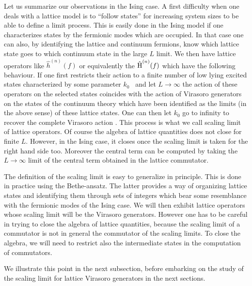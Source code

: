 

Let us summarize our observations  in the Ising case. A first difficulty when
one deals with a lattice model is to ``follow states'' for increasing system
sizes to be able to define a limit process. This is easily done in the
 Ising model if one
characterizes  states by the fermionic  modes which are occupied. In that
case one can also, by identifying the lattice and continuum fermions,
know  which lattice state goes to which continuum state in the  large $L$
limit.
 We then have lattice operators  like $\hat{h}^{(n)}(f)$
or equivalently the $\hat{\hbox{H}}^{(n)}(f)$ which have the following
behaviour.
If one first restricts their  action
to a finite number of low lying  excited states characterized
by some parameter $k_0$ \scal\  and   let
$L\rightarrow\infty$ the
action of these operators on the selected states coincides with the
action of Virasoro generators on the states of the continuum theory which have
been identified as the limits (in the above sense) of these lattice states.
One can then let $k_0$ go to infinity to recover the complete Virasoro
action \viri. This process is what we call scaling limit of  lattice operators.
Of course the algebra of lattice quantities does not
 close for finite $L$. However, in the Ising case,  it closes once
the scaling limit is taken for  the right hand side too.
 Moreover the
central term can be computed by taking the $L\rightarrow\infty$ limit
of the central term obtained in the lattice commutator.

The definition of the scaling
limit is easy to generalize in principle. This is done
 in practice using the Bethe-ansatz. The latter provides a way of organizing
lattice states and identifying
 them through sets of integers which bear some resemblance with the
fermionic modes of the Ising case.  We will then exhibit lattice operators
whose   scaling limit will be the Virasoro generators. However one has
 to be
careful in trying to close the algebra of lattice quantities,
  because the scaling limit of a  commutator
is  not in general the commutator of the scaling limits. To close the
 algebra, we will
need to restrict also the intermediate states
 in the computation of commutators.

 We illustrate  this point in the next subsection,
 before embarking on the study of
the scaling limit for lattice Virasoro generators in the next sections.





